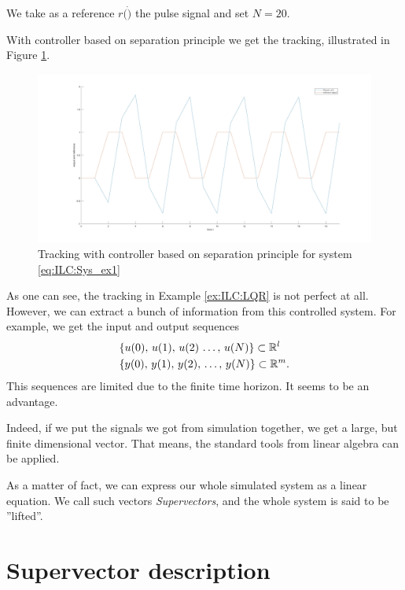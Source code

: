 \begin{example}
We take as a reference $r(\dot)$ the pulse signal and set $N = 20$. 

With controller based on separation principle we get the tracking, illustrated in  Figure \ref{img:ILC:LQR_control}.
\begin{figure}[ht]
	\centering
	\includegraphics[width=\textwidth]{fig/LQR_ex.jpg}
	\caption{Tracking with controller based on separation principle for system \eqref{eq:ILC:Sys_ex1}}
	\label{img:ILC:LQR_control}
\end{figure}
\end{example}



As one can see, the tracking in Example \ref{ex:ILC:LQR} is not perfect at all. However, we can extract a bunch of information from this controlled system. For example, we get the input and output sequences 
\begin{align}
&\{u(0), \, u(1), \,  u(2) \, \dots , \, u(N)\} \subset {\mathbb{R}}^l \label{eq:ILC:u_seq} \\
&\{y(0), \, y(1), \, y(2) , \, \dots , \, y(N)\}\subset {\mathbb{R}}^m.\label{eq:ILC:y_seq}
\end{align}
This sequences are limited due to the finite time horizon. It seems to be an advantage. 

Indeed, if we put the signals we got from simulation together, we get a large, but finite dimensional vector. That means, the standard tools from linear algebra can be applied. 

As a matter of fact, we can express our whole simulated system as a linear equation. We call such vectors \textit{Supervectors}, and the whole system is said to be ''lifted''.

\section{Supervector description} 

